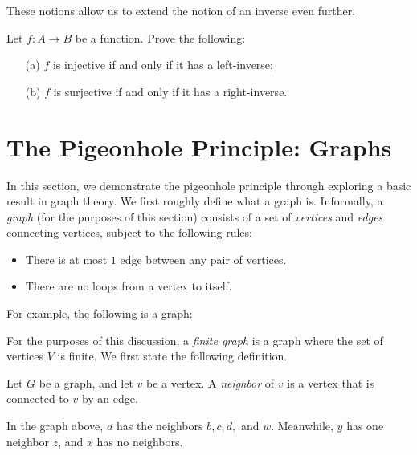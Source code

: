 \documentclass{article}
\begin{document}
These notions allow us to extend the notion of an inverse even further.
\begin{exercise}
Let $f: A\to B$ be a function. Prove the following:
\begin{itemize}
    \item[(a)] $f$ is injective if and only if it has a left-inverse;
    \item[(b)] $f$ is surjective if and only if it has a right-inverse.
\end{itemize}
\end{exercise}
\newpage

\section{The Pigeonhole Principle: Graphs}
In this section, we demonstrate the pigeonhole principle through exploring a basic result in graph theory. We first roughly define what a graph is. Informally, a \textit{graph} (for the purposes of this section) consists of a set of \textit{vertices} and \textit{edges} connecting vertices, subject to the following rules:
\begin{itemize}
    \item There is at most $1$ edge between any pair of vertices.
    \item There are no loops from a vertex to itself.
\end{itemize}
For example, the following is a graph:
\begin{center}
\end{center}
For the purposes of this discussion, a \textit{finite graph} is a graph where the set of vertices $V$ is finite. We first state the following definition.
\begin{definition}
Let $G$ be a graph, and let $v$ be a vertex. A \textit{neighbor} of $v$ is a vertex that is connected to $v$ by an edge.
\end{definition}
\begin{example}
In the graph above, $a$ has the neighbors $b, c, d,$ and $w$. Meanwhile, $y$ has one neighbor $z$, and $x$ has no neighbors.
\end{example}
\end{document}
